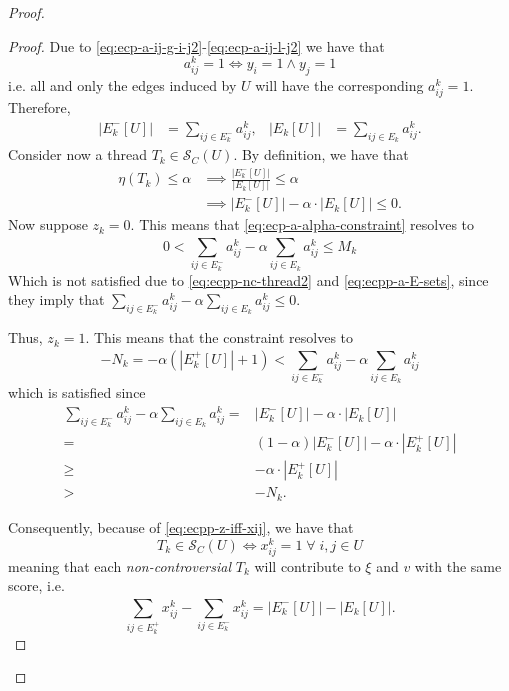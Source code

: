 \begin{proof}
\begin{proof}
		Due to \eqref{eq:ecp-a-ij-g-i-j2}-\eqref{eq:ecp-a-ij-l-j2} we
		have that
		\begin{equation}
			a_{ij}^{k} = 1 \iff y_i = 1 \land y_j = 1
		\end{equation}
		i.e. all and only the edges induced by $U$ will have the corresponding
		$a_{ij}^{k} = 1$. Therefore,
		\begin{align}
			\label{eq:ecpp-a-E-sets}
			|E^{-}_{k}[U]| & = \sum^{}_{ij \in E^-_k} a_{ij}^{k}, &
			|E_{k}[U]|     & = \sum^{}_{ij \in E_k } a_{ij}^{k}.
		\end{align}
		Consider now a thread $T_k \in \mathcal{S}_C(U)$. By definition, we
		have that
		\begin{align}
			\eta(T_k) \leq \alpha & \implies \frac{|E^{-}_{k}[U]|}{|E_{k}[U]|} \leq \alpha \\
			\label{eq:ecpp-nc-thread2}
			                      & \implies |E^{-}_{k}[U]| - \alpha \cdot
			|E_{k}[U]| \leq 0.
		\end{align}
		Now suppose $z_k = 0$. This means that
		\eqref{eq:ecp-a-alpha-constraint} resolves to
		\begin{equation*}
			0 < \sum^{}_{ij \in E^-_k} a_{ij}^{k}  - \alpha \sum^{}_{ij
				\in E_k}
			a_{ij} ^{k} \leq M_{k}
		\end{equation*}
		Which is not satisfied due to \eqref{eq:ecpp-nc-thread2} and
		\eqref{eq:ecpp-a-E-sets}, since they imply that $\sum^{}_{ij \in E^-_k} a_{ij}^{k}  - \alpha \sum^{}_{ij
				\in E_k}
			a_{ij} ^{k} \leq 0$.

		Thus, $z_k = 1$. This
		means that the constraint resolves to
		\begin{equation*}
			-N_k = -\alpha (|E^{+}_{k}[U]| + 1)< \sum^{}_{ij \in E^-_k} a_{ij}^{k}  -
			\alpha \sum^{}_{ij \in E_k} a_{ij} ^{k}
		\end{equation*}
		which is satisfied since
		\begin{align}
			\sum^{}_{ij \in E^-_k} a_{ij}^{k}  - \alpha \sum^{}_{ij \in E_k}
			a_{ij} ^{k} = & |E^{-}_{k}[U]| - \alpha \cdot |E_{k}[U]|                \\
			=             & (1- \alpha)|E^{-}_{k}[U]| - \alpha \cdot |E^{+}_{k}[U]| \\
			\geq          & - \alpha \cdot |E^{+}_{k}[U]|                           \\
			>             & - N_k.
		\end{align}

		Consequently, because of \eqref{eq:ecpp-z-iff-xij}, we have that
		\begin{equation}
			T_k \in \mathcal{S}_C(U) \iff x_{ij}^{k} = 1 \; \forall \;i, j \in U
		\end{equation}
		meaning that each \emph{non-controversial} $T_k$ will contribute to
		$\xi$ and $v$ with the same score, i.e.
		\begin{equation*}
			\sum^{}_{ij \in E^{+}_k } x_{ij}
				^{k} - \sum_{ij \in E^{-} _k} x_{ij} ^{k} = |E^{-}_{k}[U]| -
			|E_{k}[U]|.
		\end{equation*}


\end{proof}
\end{proof}
